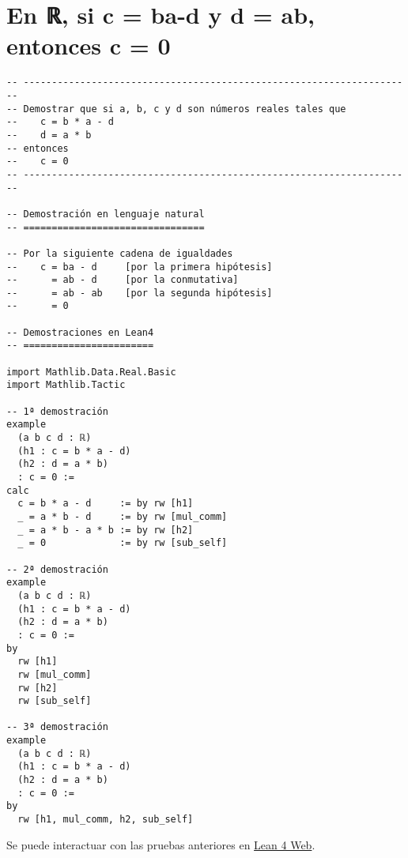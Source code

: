 \section{En ℝ, si c = ba-d y d = ab, entonces c = 0}
\label{sec:org31c1419}
\begin{verbatim}
-- ---------------------------------------------------------------------
-- Demostrar que si a, b, c y d son números reales tales que
--    c = b * a - d
--    d = a * b
-- entonces
--    c = 0
-- ---------------------------------------------------------------------

-- Demostración en lenguaje natural
-- ================================

-- Por la siguiente cadena de igualdades
--    c = ba - d     [por la primera hipótesis]
--      = ab - d     [por la conmutativa]
--      = ab - ab    [por la segunda hipótesis]
--      = 0

-- Demostraciones en Lean4
-- =======================

import Mathlib.Data.Real.Basic
import Mathlib.Tactic

-- 1ª demostración
example
  (a b c d : ℝ)
  (h1 : c = b * a - d)
  (h2 : d = a * b)
  : c = 0 :=
calc
  c = b * a - d     := by rw [h1]
  _ = a * b - d     := by rw [mul_comm]
  _ = a * b - a * b := by rw [h2]
  _ = 0             := by rw [sub_self]

-- 2ª demostración
example
  (a b c d : ℝ)
  (h1 : c = b * a - d)
  (h2 : d = a * b)
  : c = 0 :=
by
  rw [h1]
  rw [mul_comm]
  rw [h2]
  rw [sub_self]

-- 3ª demostración
example
  (a b c d : ℝ)
  (h1 : c = b * a - d)
  (h2 : d = a * b)
  : c = 0 :=
by
  rw [h1, mul_comm, h2, sub_self]
\end{verbatim}
Se puede interactuar con las pruebas anteriores en \href{https://lean.math.hhu.de/\#url=https://raw.githubusercontent.com/jaalonso/Calculemus2/main/src/Si\_c\_eq\_ba-d\_y\_d\_eq\_ab\_entonces\_c\_eq\_0.lean}{Lean 4 Web}.

